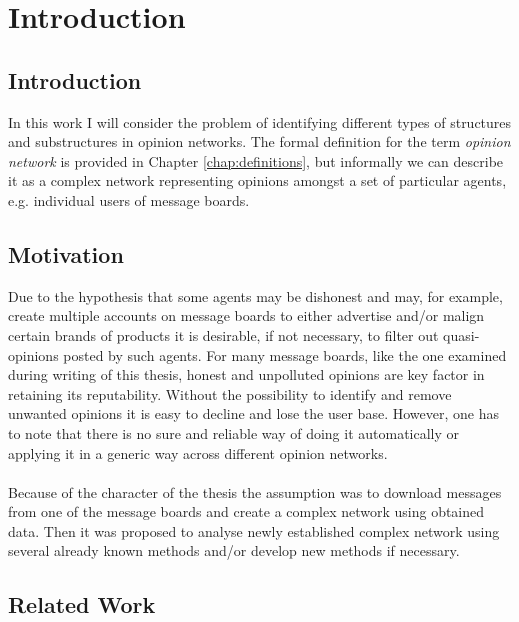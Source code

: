 \chapter{Introduction}

	\section{Introduction}

		In this work I will consider the problem of identifying different types of structures and substructures in opinion networks. The formal definition for the term \emph{opinion network} is provided in Chapter \ref{chap:definitions}, but informally we can describe it as a complex network representing opinions amongst a set of particular agents, e.g. individual users of message boards.
		
	
	\section{Motivation}

		Due to the hypothesis that some agents may be dishonest and may, for example, create multiple accounts on message boards to either advertise and/or malign certain brands of products it is desirable, if not necessary, to filter out quasi-opinions posted by such agents. For many message boards, like the one examined during writing of this thesis, honest and unpolluted opinions are key factor in retaining its reputability. Without the possibility to identify and remove unwanted opinions it is easy to decline and lose the user base. However, one has to note that there is no sure and reliable way of doing it automatically or applying it in a generic way across different opinion networks.
		\\\\
		Because of the character of the thesis the assumption was to download messages from one of the message boards and create a complex network using obtained data. Then it was proposed to analyse newly established complex network using several already known methods and/or develop new methods if necessary.
		
	\section{Related Work}
		